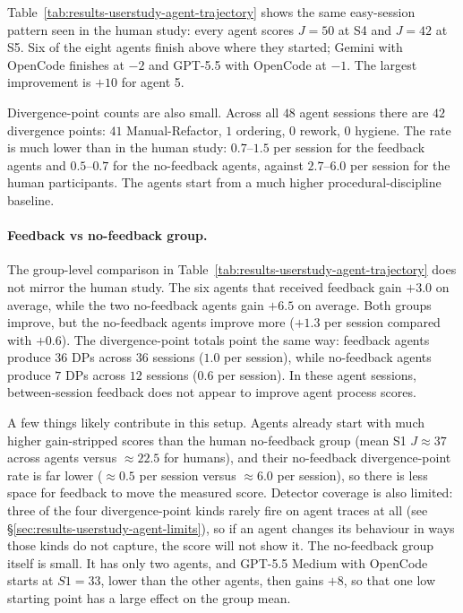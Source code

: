 Table~\ref{tab:results-userstudy-agent-trajectory} shows the same easy-session pattern seen in the human study: every agent scores $J = 50$ at S4 and $J = 42$ at S5. Six of the eight agents finish above where they started; Gemini with OpenCode finishes at $-2$ and GPT-5.5 with OpenCode at $-1$. The largest improvement is $+10$ for agent 5.

Divergence-point counts are also small. Across all $48$ agent sessions there are $42$ divergence points: $41$ Manual-Refactor, $1$ ordering, $0$ rework, $0$ hygiene. The rate is much lower than in the human study: $0.7$--$1.5$ per session for the feedback agents and $0.5$--$0.7$ for the no-feedback agents, against $2.7$--$6.0$ per session for the human participants. The agents start from a much higher procedural-discipline baseline.

\paragraph{Feedback vs no-feedback group.}
The group-level comparison in Table~\ref{tab:results-userstudy-agent-trajectory} does not mirror the human study. The six agents that received feedback gain $+3.0$ on average, while the two no-feedback agents gain $+6.5$ on average. Both groups improve, but the no-feedback agents improve more ($+1.3$ per session compared with $+0.6$). The divergence-point totals point the same way: feedback agents produce $36$ DPs across $36$ sessions ($1.0$ per session), while no-feedback agents produce $7$ DPs across $12$ sessions ($0.6$ per session). In these agent sessions, between-session feedback does not appear to improve agent process scores.

A few things likely contribute in this setup. Agents already start with much higher gain-stripped scores than the human no-feedback group (mean S1 $J \approx 37$ across agents versus $\approx 22.5$ for humans), and their no-feedback divergence-point rate is far lower ($\approx 0.5$ per session versus $\approx 6.0$ per session), so there is less space for feedback to move the measured score. Detector coverage is also limited: three of the four divergence-point kinds rarely fire on agent traces at all (see \S\ref{sec:results-userstudy-agent-limits}), so if an agent changes its behaviour in ways those kinds do not capture, the score will not show it. The no-feedback group itself is small. It has only two agents, and GPT-5.5 Medium with OpenCode starts at $S1 = 33$, lower than the other agents, then gains $+8$, so that one low starting point has a large effect on the group mean.

